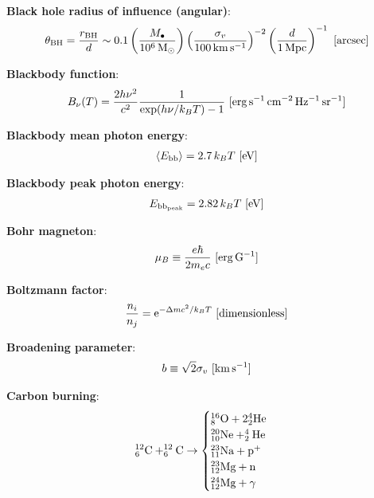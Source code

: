 \documentclass[a4paper,10pt]{article}
\begin{document}
{\noindent}\textbf{Black hole radius of influence (angular)}:
\begin{align*}
    \theta_\mathrm{BH} = \frac{r_\mathrm{BH}}{d} \sim 0.1\left(\frac{M_\bullet}{10^6\,{\rm M_\odot}}\right) \left(\frac{\sigma_v}{100\,{\rm km\,s^{-1}}}\right)^{-2} \left(\frac{d}{1\,{\rm Mpc}}\right)^{-1} ~ [{\rm arcsec}]
\end{align*}

{\noindent}\textbf{Blackbody function}:
\begin{align*}
    B_\nu(T) = \frac{2h\nu^2}{c^2} \frac{1}{\exp(h\nu/k_BT) - 1} ~ [{\rm erg\,s^{-1}\,cm^{-2}\,Hz^{-1}\,sr^{-1}}]
\end{align*}

{\noindent}\textbf{Blackbody mean photon energy}:
\begin{align*}
    \langle E_\mathrm{bb} \rangle = 2.7\,k_BT  ~ [{\rm eV}]
\end{align*}

{\noindent}\textbf{Blackbody peak photon energy}:
\begin{align*}
    E_\mathrm{bb_{peak}} = 2.82\,k_BT ~ [{\rm eV}]
\end{align*}

{\noindent}\textbf{Bohr magneton}:
\begin{align*}
    \mu_B \equiv \frac{e\hbar}{2m_ec} ~ [{\rm erg\,G^{-1}}]
\end{align*}

{\noindent}\textbf{Boltzmann factor}:
\begin{align*}
    \frac{n_i}{n_j} = \mathrm{e}^{-\Delta mc^2/k_BT} ~ [{\rm dimensionless}]
\end{align*}

{\noindent}\textbf{Broadening parameter}:
\begin{align*}
    b \equiv \sqrt{2}\sigma_v ~ [{\rm km\,s^{-1}}]
\end{align*}

{\noindent}\textbf{Carbon burning}:
\begin{equation*}
^{12}_6{\rm C} + ^{12}_6{\rm C} \rightarrow 
\begin{cases}
    {\rm ^{16}_8O + 2^4_2He} \\
    {\rm ^{20}_{10}Ne + ^4_2He} \\
    {\rm ^{23}_{11}Na + p^+} \\
    {\rm ^{23}_{12}Mg + n} \\
    {\rm ^{24}_{12}Mg + \gamma}
\end{cases}
\end{equation*}
\end{document}
